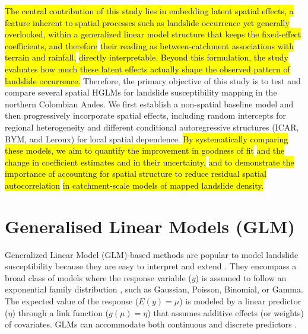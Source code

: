 \documentclass[journal abbreviation, manuscript]{copernicus}
\newcommand{\hlG}[1]{{\sethlcolor{green}\hl{#1}}}
\newcommand{\hlE}[1]{{\sethlcolor{edcyan}\hl{#1}}}
\begin{document}
\hlG{The central contribution of this study lies in embedding latent spatial effects, a feature inherent to spatial processes such as landslide occurrence yet generally overlooked, within a generalized linear model structure that keeps the fixed-effect coefficients, and therefore} \hlE{their reading as between-catchment associations with terrain and rainfall,} \hlG{directly interpretable. 
Beyond this formulation, the study evaluates how much these latent effects actually shape the observed pattern of landslide occurrence.}
Therefore, the primary objective of this study is to test and compare several spatial HGLMs for landslide susceptibility mapping in the northern Colombian Andes. 
We first establish a non-spatial baseline model and then progressively incorporate spatial effects, including random intercepts for regional heterogeneity and different conditional autoregressive structures (ICAR, BYM, and Leroux) for local spatial dependence. 
\hl{By systematically comparing these models, we aim to quantify the improvement in goodness of fit} \hlE{and the change in coefficient estimates and in their uncertainty,} \hl{and to demonstrate the importance of accounting for spatial structure to reduce residual spatial autocorrelation} \hlE{in catchment-scale models of mapped landslide density.}


\section{Generalised Linear Models (GLM)}\label{sec2}

Generalized Linear Model (GLM)-based methods are popular to model landslide susceptibility because they are easy to interpret and extend \citep{reichenbach2018review, corominas2014recommendations, guzzetti1999landslide}. They encompass a broad class of models where the response variable ($y$) is assumed to follow an exponential family distribution \citep{coxe2013generalized, hastie2017generalized}, such as Gaussian, Poisson, Binomial, or Gamma. The expected value of the response ($E(y) = \mu$) is modeled by a linear predictor ($\eta$) through a link function ($g(\mu) = \eta$) that assumes additive effects (or weights) of covariates. GLMs can accommodate both continuous and discrete predictors \citep{camilo2017handling, goetz2011integrating}.
\end{document}
